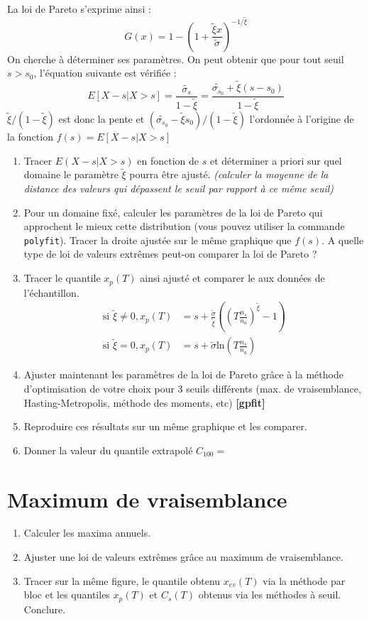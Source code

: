 \documentclass[a4paper]{article}
\begin{document}
La loi de Pareto s'exprime ainsi :
\begin{equation}
 G(x)=1-{\left(1+\frac{\tilde{\xi}x}{\tilde{\sigma}}\right)}^{-1/\tilde{\xi}}
\end{equation}
On cherche à déterminer ses paramètres. On peut obtenir que pour tout seuil $s>s_0$, l'équation suivante est vérifiée :
\begin{equation}
	E[X-s|X>s] = \frac{\tilde{\sigma_s}}{1-\tilde{\xi}} = \frac{\tilde{\sigma_{s_0}} +
\tilde{\xi}(s-s_0)}{1-\tilde{\xi}}
\end{equation}
$\tilde{\xi}/(1-\tilde{\xi})$ est donc la pente et $(\tilde{\sigma_{s_0}} -
\tilde{\xi}s_0)/(1-\tilde{\xi})$ l'ordonnée à l'origine de la fonction $f(s)=E[X-s|X>s]$ \\
\begin{enumerate}
\item Tracer $E(X-s|X>s)$ en fonction de $s$ et déterminer a priori sur quel domaine le
paramètre $\tilde{\xi}$ pourra être ajusté. \textit{(calculer la moyenne de la distance des valeurs qui dépassent le seuil par rapport à ce même seuil)}
\item Pour un domaine fixé, calculer les paramètres de la loi de Pareto qui approchent le mieux cette distribution (vous pouvez utiliser la commande \texttt{polyfit}). Tracer la droite ajustée sur le même graphique que $f(s)$. A quelle type de loi de valeurs extrêmes peut-on comparer la loi de Pareto ?
\item Tracer le quantile $x_{p}(T)$ ainsi ajusté et comparer le aux données de l'échantillon.
\begin{equation}
\begin{split}
\mbox{si }\tilde{\xi}\ne 0, x_p(T) &=
s+ \frac{\tilde{\sigma}}{\tilde{\xi}}\left(\left(T\frac{n_s}{n_a}\right)^{\tilde{\xi}}-1\right) \\
  \mbox{si } \tilde{\xi} =0, x_p(T) &= s+\tilde{\sigma}\mbox{ln}\left(T\frac{n_s}{n_a}\right)
 \end{split}
\end{equation}
\item Ajuster maintenant les paramètres de la loi de Pareto grâce à la méthode d'optimisation de votre choix pour 3 seuils différents (max. de vraisemblance, Hasting-Metropolis, méthode des moments, etc) \textbf{[gpfit]}
\item Reproduire ces résultats sur un même graphique et les comparer.
\item Donner la valeur du quantile extrapolé $C_{100}=$
\end{enumerate}

\section{Maximum de vraisemblance}
\begin{enumerate}
 \item Calculer les maxima annuels.
 \item Ajuster une loi de valeurs extrêmes grâce au maximum de vraisemblance.
\item Tracer sur la même figure, le quantile obtenu $x_{ev}(T)$ via la méthode par bloc et les quantiles $x_{p}(T)$ et $C_s(T)$ obtenus via les méthodes à seuil. Conclure.
\end{enumerate}
\end{document}
